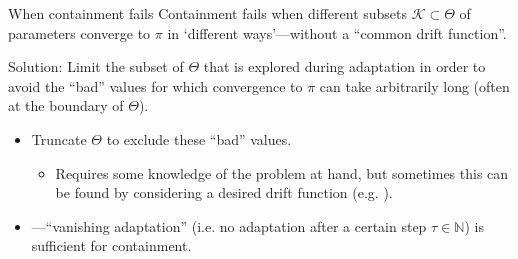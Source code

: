 \documentclass[aspectratio=169]{beamer}
\begin{document}
\begin{frame}{When containment fails}
    Containment fails when different subsets $\mathcal{K} \subset \Theta$ of parameters converge to $\pi$ 
     in `different ways'---without a ``common drift function''.%

    \pause 
    \vspace{1em}

    \alert{Solution:} Limit the subset of $\Theta$ that is explored during adaptation in order to avoid the ``bad'' values for which convergence to $\pi$ can take arbitrarily long (often at the boundary of $\Theta$).

    \pause

    \begin{itemize}[<+->]
        \item Truncate $\Theta$ to exclude these ``bad'' values. 
        \begin{itemize}
            \item Requires some knowledge of the problem at hand, but sometimes this can be found by considering a desired drift function (e.g. \cite{roberts_geometric_1996,atchade_adaptive_2006}).
        \end{itemize}
        \item \cite{andrieu_tutorial_2008}---``vanishing adaptation'' (i.e. no adaptation after a certain step $\tau \in \mathbb{N}$) is sufficient for containment.
    \end{itemize}

\end{frame}
\end{document}
